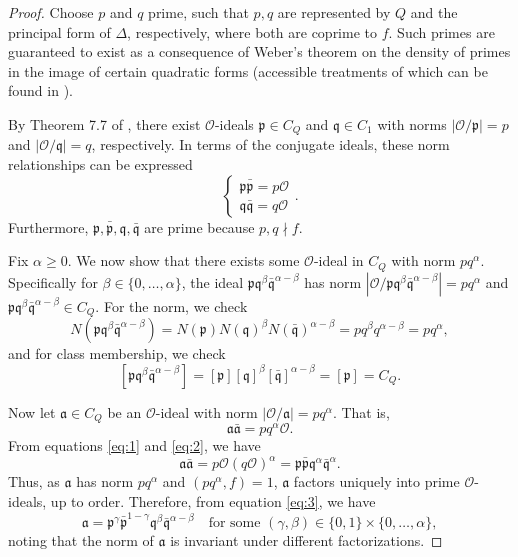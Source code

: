 \documentclass[11pt]{amsart}
\theoremstyle{definition}
\begin{document}
\begin{proof}
Choose $p$ and $q$ prime, such that $p,q$ are represented by $Q$ and the principal form of $\Delta$, respectively, where both are coprime to $f$. Such primes are guaranteed to exist as a consequence of Weber's theorem on the density of primes in the image of certain quadratic forms (accessible treatments of which can be found in \cite{Bri54,SW92}).

By Theorem 7.7 of \cite{Cox}, there exist $\mathcal{O}$-ideals $\mathfrak{p}\in C_Q$ and $\mathfrak{q}\in C_1$ with norms $|\mathcal{O}/\mathfrak{p}|=p$ and $|\mathcal{O}/\mathfrak{q}|=q$, respectively. In terms of the conjugate ideals, these norm relationships can be expressed \begin{equation}\label{eq:1}
    \begin{cases}
        \mathfrak{p\bar{p}}=p\mathcal{O}\\
        \mathfrak{q\bar{q}}=q\mathcal{O}
    \end{cases}.
\end{equation}
Furthermore, $\mathfrak{p},\mathfrak{\bar{p}},\mathfrak{q},\mathfrak{\bar{q}}$ are prime because $p,q\nmid f$.

Fix $\alpha\geq 0$. We now show that there exists some $\mathcal{O}$-ideal in $C_Q$ with norm $pq^{\alpha}$. Specifically for $\beta\in\{0,\dots,\alpha\}$, the ideal $\mathfrak{p}\mathfrak{q}^\beta\bar{\mathfrak{q}}^{\alpha-\beta}$ has norm $|\mathcal{O}/\mathfrak{p}\mathfrak{q}^\beta\bar{\mathfrak{q}}^{\alpha-\beta}|=pq^\alpha$ and $\mathfrak{p}\mathfrak{q}^\beta\bar{\mathfrak{q}}^{\alpha-\beta}\in C_Q$. For the norm, we check \[N(\mathfrak{p}\mathfrak{q}^\beta\bar{\mathfrak{q}}^{\alpha-\beta})=N(\mathfrak{p})N(\mathfrak{q})^\beta N(\bar{\mathfrak{q}})^{\alpha-\beta}=pq^{\beta}q^{\alpha-\beta}=pq^{\alpha},\] and for class membership, we check \[[\mathfrak{p}\mathfrak{q}^{\beta}\mathfrak{\bar{q}}^{\alpha-\beta}]=[\mathfrak{p}][\mathfrak{q}]^\beta[\mathfrak{\bar{q}}]^{\alpha-\beta}=[\mathfrak{p}]=C_Q.\]

Now let $\mathfrak{a}\in C_Q$ be an $\mathcal{O}$-ideal with norm $|\mathcal{O}/\mathfrak{a}|=pq^{\alpha}$. That is,
\begin{equation}\label{eq:2}
    \mathfrak{a\bar{a}}=pq^\alpha\mathcal{O}.
\end{equation}
From equations \ref{eq:1} and \ref{eq:2}, we have
\begin{equation}\label{eq:3}
    \mathfrak{a\bar{a}}=p\mathcal{O}(q\mathcal{O})^\alpha=\mathfrak{p\bar{p}}\mathfrak{q}^\alpha\mathfrak{\bar{q}}^\alpha.
\end{equation}
Thus, as $\mathfrak{a}$ has norm $pq^{\alpha}$ and $(pq^{\alpha}, f)=1$, $\mathfrak{a}$ factors uniquely into prime $\mathcal{O}$-ideals, up to order. Therefore, from equation \ref{eq:3}, we have 
\begin{equation}\label{eq:4}
    \mathfrak{a}=\mathfrak{p}^{\gamma}\mathfrak{\bar{p}}^{1-\gamma}\mathfrak{q}^{\beta}\mathfrak{\bar{q}}^{\alpha-\beta}\quad\text{for some $(\gamma,\beta)\in\{0,1\}\times\{0,\dots,\alpha\}$},
\end{equation}
noting that the norm of $\mathfrak{a}$ is invariant under different factorizations.


\end{proof}
\end{document}
